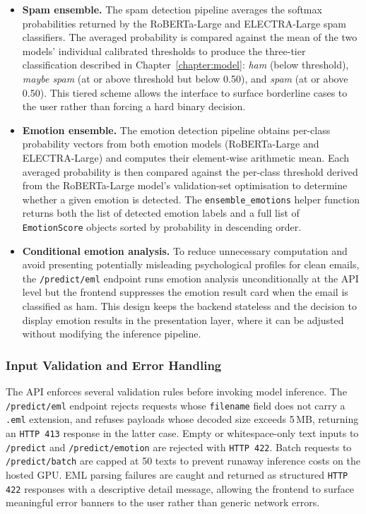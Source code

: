 \begin{itemize}
    \item \textbf{Spam ensemble.} The spam detection pipeline averages the softmax probabilities returned by the \acs{RoBERTa}-Large and \acs{ELECTRA}-Large spam classifiers. The averaged probability is compared against the mean of the two models' individual calibrated thresholds to produce the three-tier classification described in Chapter~\ref{chapter:model}: \textit{ham} (below threshold), \textit{maybe spam} (at or above threshold but below 0.50), and \textit{spam} (at or above 0.50). This tiered scheme allows the interface to surface borderline cases to the user rather than forcing a hard binary decision.

    \item \textbf{Emotion ensemble.} The emotion detection pipeline obtains per-class probability vectors from both emotion models (\acs{RoBERTa}-Large and \acs{ELECTRA}-Large) and computes their element-wise arithmetic mean. Each averaged probability is then compared against the per-class threshold derived from the \acs{RoBERTa}-Large model's validation-set optimisation to determine whether a given emotion is detected. The \texttt{ensemble\_emotions} helper function returns both the list of detected emotion labels and a full list of \texttt{EmotionScore} objects sorted by probability in descending order.

    \item \textbf{Conditional emotion analysis.} To reduce unnecessary computation and avoid presenting potentially misleading psychological profiles for clean emails, the \texttt{/predict/eml} endpoint runs emotion analysis unconditionally at the \ac{API} level but the frontend suppresses the emotion result card when the email is classified as ham. This design keeps the backend stateless and the decision to display emotion results in the presentation layer, where it can be adjusted without modifying the inference pipeline.
\end{itemize}

\subsubsection{Input Validation and Error Handling}

The \ac{API} enforces several validation rules before invoking model inference. The \texttt{/predict/eml} endpoint rejects requests whose \texttt{filename} field does not carry a \texttt{.eml} extension, and refuses payloads whose decoded size exceeds 5\,MB, returning an \texttt{HTTP 413} response in the latter case. Empty or whitespace-only text inputs to \texttt{/predict} and \texttt{/predict/emotion} are rejected with \texttt{HTTP 422}. Batch requests to \texttt{/predict/batch} are capped at 50 texts to prevent runaway inference costs on the hosted \ac{GPU}. EML parsing failures are caught and returned as structured \texttt{HTTP 422} responses with a descriptive detail message, allowing the frontend to surface meaningful error banners to the user rather than generic network errors.

